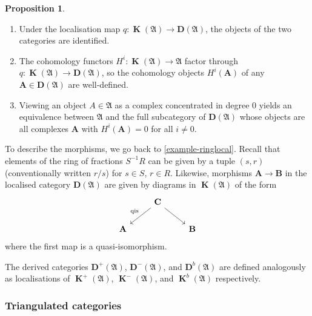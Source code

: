 \documentclass[a4paper]{article}
\theoremstyle{definition}
\newtheorem{prop}[defn]{Proposition}
\theoremstyle{remark}
\DeclareMathOperator{\kom}{{\mathbf{K}}}
\newcommand{\deri}{\mathbf{D}}
\begin{document}
\begin{prop}
    \begin{enumerate}
        \item Under the localisation map \(q: \kom(\mathfrak{A})\rightarrow
            \deri(\mathfrak{A})\), the objects of the two categories are
            identified.
        \item The cohomology functors \(H^i:\kom(\mathfrak{A})\rightarrow
            \mathfrak{A}\) factor through \(q: \kom(\mathfrak{A})\rightarrow
            \deri(\mathfrak{A})\), so the cohomology objects \(H^i(\mathbf{A})\)
            of any \(\mathbf{A}\in \deri(\mathfrak{A})\) are well-defined.
        \item Viewing an object \(A\in \mathfrak{A}\) as a complex concentrated
            in degree \(0\) yields an equivalence between \(\mathfrak{A}\) and
            the full subcategory of \(\deri(\mathfrak{A})\) whose objects are
            all complexes \(\mathbf{A}\) with \(H^i(\mathbf{A})=0\) for all
            \(i\neq 0\).
    \end{enumerate}
\end{prop}

To describe the morphisms, we go back to \cref{example-ringlocal}. Recall that
elements of the ring of fractions \(S^{-1}R\) can be given by a tuple \((s,r)\)
(conventionally written \(r/s\)) for \(s\in S,\, r\in R\).  Likewise, morphisms
\(\mathbf{A}\rightarrow \mathbf{B}\) in the localised category
\(\deri(\mathfrak{A})\) are given by diagrams in \(\kom(\mathfrak{A})\) of the
form
\[\begin{tikzcd}
    &\mathbf{C} \arrow[dl, "\text{qis}"'] \arrow[dr]& \\
    \mathbf{A}&&\mathbf{B}
\end{tikzcd}\]
where the first map is a quasi-isomorphism. 

The derived categories \(\deri^+(\mathfrak{A})\), \(\deri^-(\mathfrak{A})\),
and \(\deri^b(\mathfrak{A})\) are defined analogously as localisations of
\(\kom^+(\mathfrak{A})\), \(\kom^-(\mathfrak{A})\), and \(\kom^b(\mathfrak{A})\)
respectively.

\subsubsection{Triangulated categories} 
\end{document}
